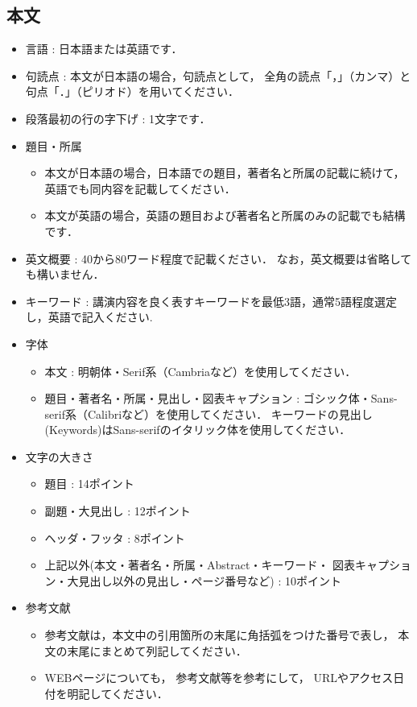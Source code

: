 \documentclass{ltjoc}
\begin{document}
\subsection{本文}
\begin{itemize}
\item 言語 : 日本語または英語です．
\item 句読点 : 本文が日本語の場合，句読点として，
  全角の読点「，」（カンマ）と句点「．」（ピリオド）を用いてください． 
\item 段落最初の行の字下げ : 1文字です．
\item 題目・所属
  \begin{itemize}
  \item 
    本文が日本語の場合，日本語での題目，著者名と所属の記載に続けて，
    英語でも同内容を記載してください．
  \item 
    本文が英語の場合，英語の題目および著者名と所属のみの記載でも結構です．
  \end{itemize}
\item 英文概要 : 40から80ワード程度で記載ください．
  なお，英文概要は省略しても構いません．
\item キーワード : 講演内容を良く表すキーワードを最低3語，通常5語程度選定し，英語で記入ください.
\item 字体
  \begin{itemize}
  \item 本文 :
    明朝体・Serif系（Cambriaなど）を使用してください．
  \item 題目・著者名・所属・見出し・図表キャプション : 
    ゴシック体・Sans-serif系（Calibriなど）を使用してください．
    キーワードの見出し(Keywords)はSans-serifのイタリック体を使用してください．
  \end{itemize}
\item 文字の大きさ
  \begin{itemize}
  \item 題目 : 14ポイント
  \item 副題・大見出し : 12ポイント
  \item ヘッダ・フッタ : 8ポイント
  \item 上記以外(本文・著者名・所属・Abstract・キーワード・
      図表キャプション・大見出し以外の見出し・ページ番号など) : 10ポイント
  \end{itemize}
\item 参考文献
  \begin{itemize}
  \item 
  参考文献は，本文中の引用箇所の末尾に角括弧をつけた番号で表し，
  本文の末尾にまとめて列記してください．
  \item 
  WEBページについても，
  参考文献\cite{SIST02-200}等を参考にして，
  URLやアクセス日付を明記してください．
  \end{itemize}
\end{itemize}
\end{document}
